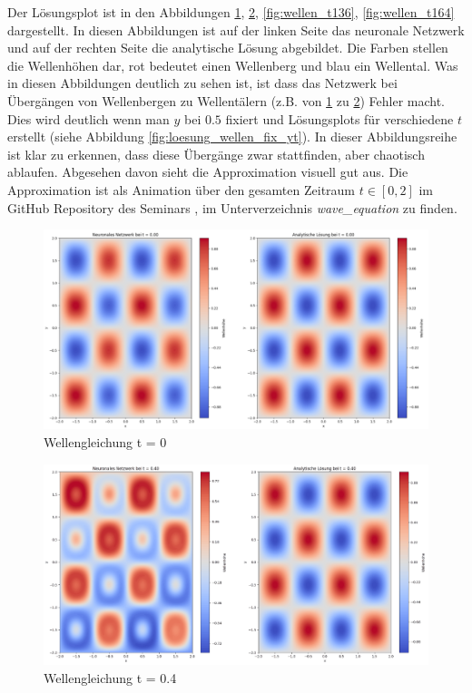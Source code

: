 Der Lösungsplot ist in den Abbildungen \ref{fig:wellen_t0}, \ref{fig:wellen_t04}, \ref{fig:wellen_t136}, \ref{fig:wellen_t164} dargestellt.
In diesen Abbildungen ist auf der linken Seite das neuronale Netzwerk und auf der rechten Seite die analytische Lösung abgebildet.
Die Farben stellen die Wellenhöhen dar, rot bedeutet einen Wellenberg und blau ein Wellental.
Was in diesen Abbildungen deutlich zu sehen ist, ist dass das Netzwerk bei Übergängen von Wellenbergen zu Wellentälern (z.B. von \ref{fig:wellen_t0} zu \ref{fig:wellen_t04}) Fehler macht.
Dies wird deutlich wenn man $y$ bei $0.5$ fixiert und Lösungsplots für verschiedene $t$ erstellt (siehe Abbildung \ref{fig:loesung_wellen_fix_yt}).
In dieser Abbildungsreihe ist klar zu erkennen, dass diese Übergänge zwar stattfinden, aber chaotisch ablaufen.
Abgesehen davon sieht die Approximation visuell gut aus.
Die Approximation ist als Animation über den gesamten Zeitraum $t \in [0, 2]$ im GitHub Repository des Seminars \cite{neuronal:github_source_code}, im Unterverzeichnis \emph{wave\_equation} zu finden.
\begin{figure}
    \centering
    \includegraphics[width=\textwidth]{papers/neuronal/images/prediction_wave_t0.png}
    \caption{Wellengleichung t = 0}
    \label{fig:wellen_t0}
\end{figure}
\begin{figure}
    \centering
    \includegraphics[width=\textwidth]{papers/neuronal/images/prediction_wave_t04.png}
    \caption{Wellengleichung t = 0.4}
    \label{fig:wellen_t04}
\end{figure}
